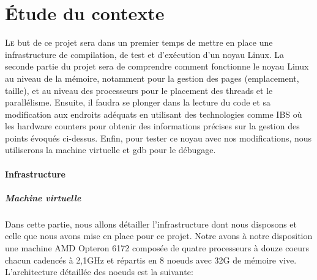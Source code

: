 \chapter{Étude du contexte}

  \lettrine[nindent=0em,lines=3]{L}e but de ce projet sera dans un premier temps
  de mettre en place une infrastructure de compilation, de test et d'exécution
  d'un noyau Linux. La seconde partie du projet sera de comprendre comment
  fonctionne le noyau Linux au niveau de la mémoire, notamment pour la gestion
  des pages (emplacement, taille), et au niveau des processeurs pour le
  placement des threads et le parallélisme. Ensuite, il faudra se plonger dans
  la lecture du code et sa modification aux endroits adéquats en utilisant des
  technologies comme IBS où les hardware counters pour obtenir des informations
  précises sur la gestion des points évoqués ci-dessus. Enfin, pour tester ce
  noyau avec nos modifications, nous utiliserons la machine virtuelle et gdb
  pour le débugage.

  \subsubsection{Infrastructure}
    \paragraph{Machine virtuelle}
        Dans cette partie, nous allons détailler l'infrastructure dont nous
        disposons et celle que nous avons mise en place pour ce projet. Notre avons
        à notre disposition une machine AMD Opteron 6172 composée de quatre
        processeurs à douze coeurs chacun cadencés à 2,1GHz et répartis en 8 noeuds
        avec 32G de mémoire vive. L'architecture détaillée des noeuds est la
        suivante:


